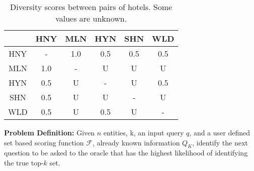 \begin{table}[h!]
\centering
\begin{tabular}{|c|c|c|c|c|c|}
\hline
       & HNY  & MLN  & HYN  & SHN  & WLD  \\ \hline
HNY    & -   & 1.0  & 0.5    & 0.5  & 0.5  \\ \hline
MLN    & 1.0  & -    & U    & U  & U  \\ \hline
HYN    & 0.5    & U    & -    & U  & 0.5    \\ \hline
SHN    & 0.5  & U  & U  & -    & U  \\ \hline
WLD    & 0.5  & U  & 0.5   & U  & -    \\ \hline
\end{tabular}
\caption{Diversity scores between pairs of hotels. Some values are unknown.}
\label{tab:ny_hotels_diversity}
\end{table}





\textbf{Problem Definition:} Given \( n \) entities, k, an input query \( q \), and a user defined set based scoring function \( \mathcal{F} \), already known information \( Q_K \), identify the next question to be asked to the oracle that has the highest likelihood of identifying the true top-$k$ set.

